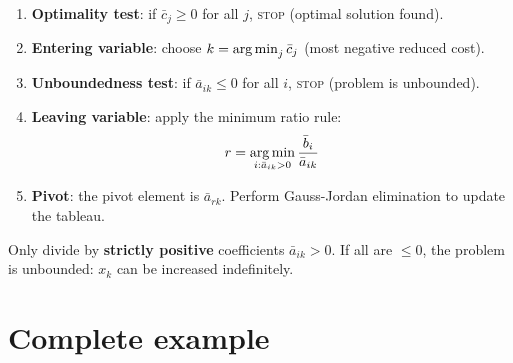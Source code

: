 \begin{algorithme}[title=\textbf{One simplex iteration (minimization)}]
\begin{enumerate}
  \item \textbf{Optimality test}: if $\bar{c}_j \ge 0$ for all $j$,
        \textsc{stop} (optimal solution found).
  \item \textbf{Entering variable}: choose $k = \operatorname*{arg\,min}_j \bar{c}_j$
        (most negative reduced cost).
  \item \textbf{Unboundedness test}: if $\bar{a}_{ik} \le 0$ for all $i$,
        \textsc{stop} (problem is unbounded).
  \item \textbf{Leaving variable}: apply the minimum ratio rule:
        \[
          r = \operatorname*{arg\,min}_{i : \bar{a}_{ik} > 0}
            \frac{\bar{b}_i}{\bar{a}_{ik}}
        \]
  \item \textbf{Pivot}: the pivot element is $\bar{a}_{rk}$.  Perform
        Gauss-Jordan elimination to update the tableau.
\end{enumerate}
\end{algorithme}

\begin{warning}[title=\textbf{Ratio rule}]
Only divide by \textbf{strictly positive} coefficients $\bar{a}_{ik} > 0$.
If all are $\le 0$, the problem is unbounded: $x_k$ can be increased
indefinitely.
\end{warning}

\section{Complete example}


